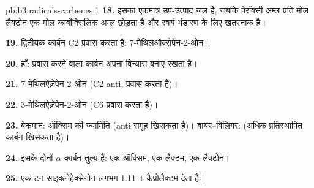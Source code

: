 \begin{solution}{pb:b3:radicals-carbenes:1}
\textbf{18.} इसका एकमात्र उप-उत्पाद जल है, जबकि पेरॉक्सी अम्ल प्रति मोल लैक्टोन एक मोल
कार्बोक्सिलिक अम्ल छोड़ता है और स्वयं भंडारण के लिए ख़तरनाक है।

\textbf{19.} द्वितीयक कार्बन C2 प्रवास करता है: 7-मेथिलऑक्सेपेन-2-ओन।

\textbf{20.} हाँ: प्रवास करने वाला कार्बन अपना विन्यास बनाए रखता है।

\textbf{21.} 7-मेथिलऐज़ेपेन-2-ओन (C2 anti, प्रवास करता है)।

\textbf{22.} 3-मेथिलऐज़ेपेन-2-ओन (C6 प्रवास करता है)।

\textbf{23.} बेकमान: ऑक्सिम की ज्यामिति (anti समूह खिसकता है)।
बायर--विलिगर:  (अधिक प्रतिस्थापित कार्बन खिसकता है)।

\textbf{24.} इसके दोनों $\alpha$ कार्बन तुल्य हैं: एक ऑक्सिम, एक लैक्टम, एक लैक्टोन।

\textbf{25.} एक टन साइक्लोहेक्सेनोन लगभग \qty{1.11}{t} कैप्रोलैक्टम देता है।
\end{solution}
